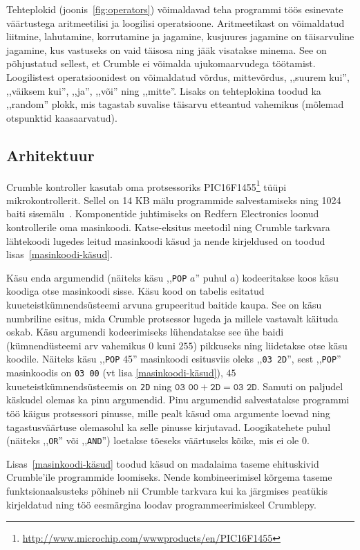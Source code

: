 \documentclass[12pt]{article}
\begin{document}
Tehteplokid (joonis~\ref{fig:operators}) võimaldavad teha programmi töös esinevate väärtustega aritmeetilisi ja loogilisi operatsioone. Aritmeetikast on võimaldatud liitmine, lahutamine, korrutamine ja jagamine, kusjuures jagamine on täisarvuline jagamine, kus vastuseks on vaid täisosa ning jääk visatakse minema. See on põhjustatud sellest, et Crumble ei võimalda ujukomaarvudega töötamist. Loogilistest operatsioonidest on võimaldatud võrdus, mittevõrdus, ,,suurem kui'', ,,väiksem kui'', ,,ja'', ,,või'' ning ,,mitte''. Lisaks on tehteplokina toodud ka ,,random'' plokk, mis tagastab suvalise täisarvu etteantud vahemikus (mõlemad otspunktid kaasaarvatud).

\subsection{Arhitektuur}

Crumble kontroller kasutab oma protsessoriks PIC16F1455\footnote{\url{http://www.microchip.com/wwwproducts/en/PIC16F1455}} tüüpi mikrokontrollerit. Sellel on 14 KB mälu programmide salvestamiseks ning 1024 baiti sisemälu~\cite{PIC16F1455}. Komponentide juhtimiseks on Redfern Electronics loonud kontrollerile oma masinkoodi. Katse-eksitus meetodil ning Crumble tarkvara lähtekoodi lugedes leitud masinkoodi käsud ja nende kirjeldused on toodud lisas~\ref{masinkoodi-käsud}. 


Käsu enda argumendid (näiteks käsu ,,\texttt{POP} $a$'' puhul $a$) kodeeritakse koos käsu koodiga otse masinkoodi sisse. Käsu kood on tabelis esitatud kuueteistkümnendsüsteemi arvuna grupeeritud baitide kaupa. See on käsu numbriline esitus, mida Crumble protsessor lugeda ja millele vastavalt käituda oskab. Käsu argumendi kodeerimiseks lühendatakse see ühe baidi (kümnendüsteemi arv vahemikus $0$ kuni $255$) pikkuseks ning liidetakse otse käsu koodile. Näiteks käsu ,,\texttt{POP} 45'' masinkoodi esitusviis oleks ,,\texttt{03~2D}'', sest ,,\texttt{POP}'' masinkoodis on \texttt{03 00} (vt lisa \ref{masinkoodi-käsud}), $45$ kuueteistkümnendsüsteemis on \texttt{2D} ning $\texttt{03 00} + \texttt{2D} = \texttt{03 2D}$. Samuti on paljudel käskudel olemas ka pinu argumendid. Pinu argumendid salvestatakse programmi töö käigus protsessori pinusse, mille pealt käsud oma argumente loevad ning tagastusväärtuse olemasolul ka selle pinusse kirjutavad. Loogikatehete puhul (näiteks ,,\texttt{OR}'' või ,,\texttt{AND}'') loetakse tõeseks väärtuseks kõike, mis ei ole $0$.

Lisas~\ref{masinkoodi-käsud} toodud käsud on madalaima taseme ehituskivid Crumble'ile programmide loomiseks. Nende kombineerimisel kõrgema taseme funktsionaalsusteks põhineb nii Crumble tarkvara kui ka järgmises peatükis kirjeldatud ning töö eesmärgina loodav programmeerimiskeel Crumblepy.
\end{document}
